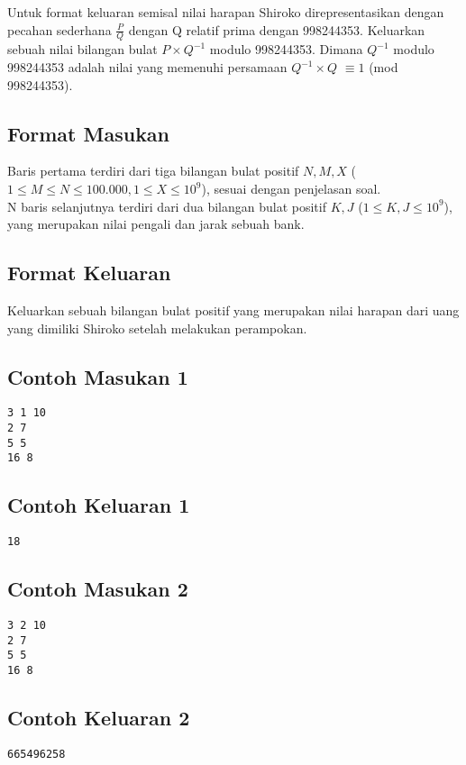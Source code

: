 \documentclass{article}
\begin{document}
Untuk format keluaran semisal nilai harapan Shiroko direpresentasikan dengan pecahan sederhana $\frac{P}{Q}$ dengan Q relatif prima dengan 998244353. Keluarkan sebuah nilai bilangan bulat $P \times Q^{-1}$ modulo 998244353. Dimana $Q^{-1}$ modulo 998244353 adalah nilai yang memenuhi persamaan $Q^{-1} \times Q$ $\equiv 1$ (mod 998244353). 

\subsection*{Format Masukan}

Baris pertama terdiri dari tiga bilangan bulat positif $N, M, X$ ($1 \leq M \leq N \leq 100.000, 1 \leq X \leq 10^{9}$), sesuai dengan penjelasan soal.\\
N baris selanjutnya terdiri dari dua bilangan bulat positif $K, J$ ($1 \leq K, J \leq 10^{9}$), yang merupakan nilai pengali dan jarak sebuah bank.

\subsection*{Format Keluaran}

Keluarkan sebuah bilangan bulat positif yang merupakan nilai harapan dari uang yang dimiliki Shiroko setelah melakukan perampokan.

\begin{multicols}{2}
\subsection*{Contoh Masukan 1}
\begin{lstlisting}
3 1 10
2 7
5 5
16 8
\end{lstlisting}
\columnbreak
\subsection*{Contoh Keluaran 1}
\begin{lstlisting}
18
\end{lstlisting}
\vfill
\null
\end{multicols}

\begin{multicols}{2}
\subsection*{Contoh Masukan 2}
\begin{lstlisting}
3 2 10
2 7
5 5
16 8
\end{lstlisting}
\columnbreak
\subsection*{Contoh Keluaran 2}
\begin{lstlisting}
665496258
\end{lstlisting}
\vfill
\null
\end{multicols}
\end{document}
